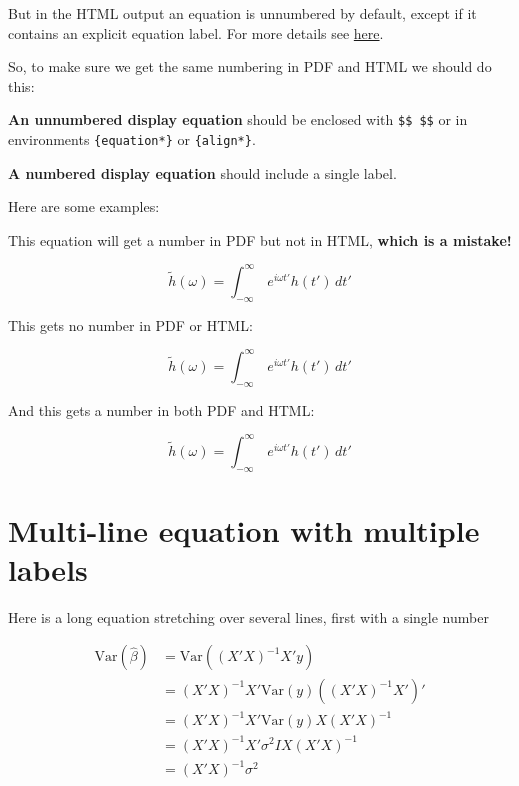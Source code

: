 \documentclass[
]{book}
\begin{document}
But in the HTML output an equation is unnumbered by default, except if it contains an explicit equation label. For more details see \href{https://bookdown.org/yihui/bookdown/markdown-extensions-by-bookdown.html}{here}.

So, to make sure we get the same numbering in PDF and HTML we should do this:

\textbf{An unnumbered display equation} should be enclosed with \texttt{\$\$\ \$\$} or in environments \texttt{\{equation*\}} or \texttt{\{align*\}}.

\textbf{A numbered display equation} should include a single label.

Here are some examples:

This equation will get a number in PDF but not in HTML, \textbf{which is a mistake!}

\begin{equation} 
  \tilde h(\omega) = \int_{-\infty}^{\infty}\,e^{i\omega t'} h(t') \, dt'
\end{equation}

This gets no number in PDF or HTML:

\begin{equation*} 
  \tilde h(\omega) = \int_{-\infty}^{\infty}\,e^{i\omega t'} h(t') \, dt'
\end{equation*}

And this gets a number in both PDF and HTML:

\begin{equation} 
  \tilde h(\omega) = \int_{-\infty}^{\infty}\,e^{i\omega t'} h(t') \, dt'
  \label{eq:transfu}
\end{equation}

\hypertarget{multi-line-equation-with-multiple-labels}{%
\section{Multi-line equation with multiple labels}\label{multi-line-equation-with-multiple-labels}}

Here is a long equation stretching over several lines, first with a single number

\begin{equation} 
\begin{split}
\mathrm{Var}(\hat{\beta}) & =\mathrm{Var}((X'X)^{-1}X'y)\\
 & =(X'X)^{-1}X'\mathrm{Var}(y)((X'X)^{-1}X')'\\
 & =(X'X)^{-1}X'\mathrm{Var}(y)X(X'X)^{-1}\\
 & =(X'X)^{-1}X'\sigma^{2}IX(X'X)^{-1}\\
 & =(X'X)^{-1}\sigma^{2}
\end{split}
\label{eq:var-beta1}
\end{equation}
\end{document}
